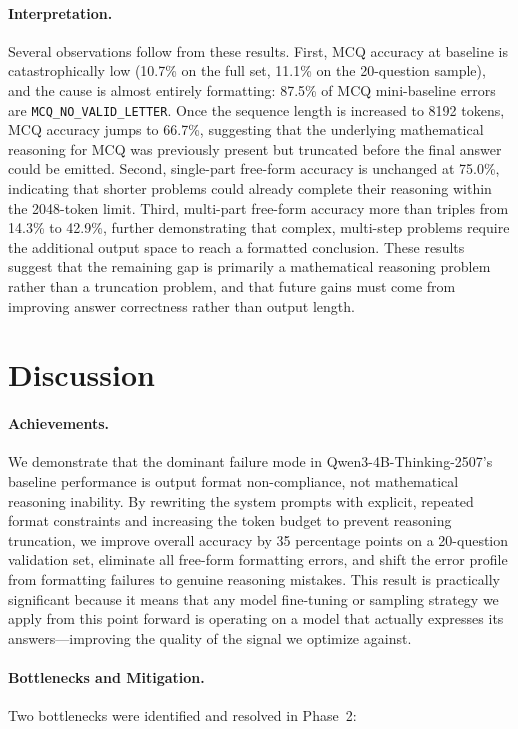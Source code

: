 \documentclass{article}
\begin{document}
\paragraph{Interpretation.}
Several observations follow from these results. First, MCQ accuracy at baseline is catastrophically low (10.7\% on the full set, 11.1\% on the 20-question sample), and the cause is almost entirely formatting: 87.5\% of MCQ mini-baseline errors are \texttt{MCQ\_NO\_VALID\_LETTER}. Once the sequence length is increased to 8192 tokens, MCQ accuracy jumps to 66.7\%, suggesting that the underlying mathematical reasoning for MCQ was previously present but truncated before the final answer could be emitted. Second, single-part free-form accuracy is unchanged at 75.0\%, indicating that shorter problems could already complete their reasoning within the 2048-token limit. Third, multi-part free-form accuracy more than triples from 14.3\% to 42.9\%, further demonstrating that complex, multi-step problems require the additional output space to reach a formatted conclusion. These results suggest that the remaining gap is primarily a mathematical reasoning problem rather than a truncation problem, and that future gains must come from improving answer correctness rather than output length.


\section{Discussion}
\label{sec:discussion}

\paragraph{Achievements.}
We demonstrate that the dominant failure mode in Qwen3-4B-Thinking-2507's baseline performance is output format non-compliance, not mathematical reasoning inability. By rewriting the system prompts with explicit, repeated format constraints and increasing the token budget to prevent reasoning truncation, we improve overall accuracy by 35 percentage points on a 20-question validation set, eliminate all free-form formatting errors, and shift the error profile from formatting failures to genuine reasoning mistakes. This result is practically significant because it means that any model fine-tuning or sampling strategy we apply from this point forward is operating on a model that actually expresses its answers—improving the quality of the signal we optimize against.

\paragraph{Bottlenecks and Mitigation.}
Two bottlenecks were identified and resolved in Phase~2:
\end{document}
